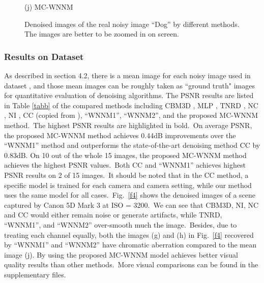 \documentclass[10pt,twocolumn,letterpaper,sort&compress]{article}
\begin{document}
\begin{figure}
{\begin{minipage}[t]{0.2\textwidth}
{\footnotesize (j) MC-WNNM  }
\end{minipage}
}
\vspace{-2mm}
\caption{Denoised images of the real noisy image ``Dog'' \cite{ncwebsite} by different methods. The images are better to be zoomed in on screen.}
\label{fig3}
\end{figure}


\subsubsection{Results on Dataset \cite{crosschannel2016}}
As described in section 4.2, there is a mean image for each noisy image used in dataset \cite{crosschannel2016}, and those mean images can be roughly taken as ``ground truth" images for quantitative evaluation of denoising algorithms. The PSNR results are listed in Table \ref{tabb} of the compared methods including CBM3D \cite{cbm3d}, MLP \cite{mlp}, TNRD \cite{chen2015learning}, NC \cite{noiseclinic,ncwebsite}, NI \cite{neatimage},
CC \cite{crosschannel2016} (copied from \cite{crosschannel2016}), ``WNNM1'', ``WNNM2'', and the proposed MC-WNNM method.\ The highest PSNR results are highlighted in bold.\ On average PSNR, the proposed MC-WNNM method achieves 0.44dB improvements over the ``WNNM1'' method and outperforms the state-of-the-art denoising method CC \cite{crosschannel2016} by 0.83dB. On 10 out of the whole 15 images, the proposed MC-WNNM method achieves the highest PSNR values.\ Both CC and ``WNNM1'' achieves highest PSNR results on 2 of 15 images.\ It should be noted that in the CC method, a specific model is trained for each camera and camera setting, while our method uses the same model for all cases.\ Fig.\ \ref{f4} shows the denoised images of a scene captured by Canon 5D Mark 3 at ISO = 3200.\ We can see that CBM3D, NI, NC and CC would either remain noise or generate artifacts, while TNRD, ``WNNM1'', and ``WNNM2'' over-smooth much the image.\ Besides, due to treating each channel equally, both the images (g) and (h) in Fig.\ \ref{f4} recovered by ``WNNM1'' and ``WNNM2'' have chromatic aberration compared to the mean image (j).  By using the proposed MC-WNNM model achieves better visual quality results than other methods.\ More visual comparisons can be found in the supplementary files.
\end{document}
